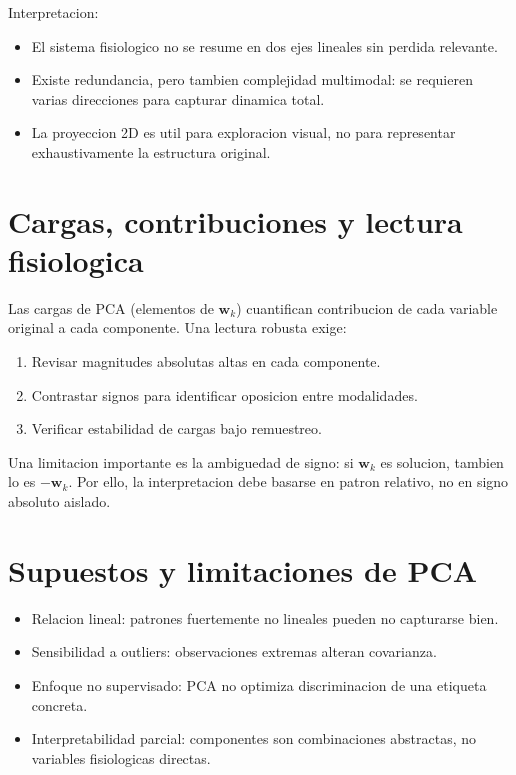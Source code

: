 \documentclass[12pt,a4paper,oneside]{report}
\begin{document}
Interpretacion:
\begin{itemize}
\item El sistema fisiologico no se resume en dos ejes lineales sin perdida relevante.
\item Existe redundancia, pero tambien complejidad multimodal: se requieren varias direcciones para capturar dinamica total.
\item La proyeccion 2D es util para exploracion visual, no para representar exhaustivamente la estructura original.
\end{itemize}

\section{Cargas, contribuciones y lectura fisiologica}

Las cargas de PCA (elementos de $\mathbf{w}_k$) cuantifican contribucion de cada variable original a cada componente. Una lectura robusta exige:
\begin{enumerate}
\item Revisar magnitudes absolutas altas en cada componente.
\item Contrastar signos para identificar oposicion entre modalidades.
\item Verificar estabilidad de cargas bajo remuestreo.
\end{enumerate}

Una limitacion importante es la ambiguedad de signo: si $\mathbf{w}_k$ es solucion, tambien lo es $-\mathbf{w}_k$. Por ello, la interpretacion debe basarse en patron relativo, no en signo absoluto aislado.

\section{Supuestos y limitaciones de PCA}

\begin{itemize}
\item Relacion lineal: patrones fuertemente no lineales pueden no capturarse bien.
\item Sensibilidad a outliers: observaciones extremas alteran covarianza.
\item Enfoque no supervisado: PCA no optimiza discriminacion de una etiqueta concreta.
\item Interpretabilidad parcial: componentes son combinaciones abstractas, no variables fisiologicas directas.
\end{itemize}
\end{document}
